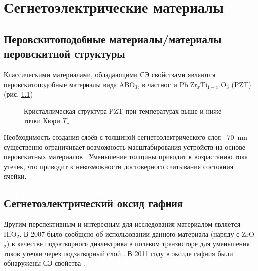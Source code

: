 \chapter{Сегнетоэлектрические материалы}\label{ch:ch1}
\section{Перовскитоподобные материалы/материалы перовскитной структуры}
Классическими материалами, обладающими СЭ свойствами являются перовскитоподобные материалы вида ABO\(_3\), в частности Pb[Zr\(_x\)Ti\(_{1-x}\)]O\(_3\) (PZT) (рис. \cref{fig:pzt})

\begin{figure}[ht]
    \caption{Кристаллическая структура PZT при температурах выше и ниже точки Кюри \(T_c\)}\label{fig:pzt}
\end{figure}

Необходимость создания слоёв с толщиной сегнетоэлектрического слоя \(~\) \SI{70}{\nano\meter} существенно ограничивает возможность масштабирования устройств на основе перовскитных материалов \cite{parkReviewPerspectiveFerroelectric2018}. Уменьшение толщины приводит к возрастанию тока утечек, что приводит к невозможности достоверного считывания состояния ячейки.
\section{Сегнетоэлектрический оксид гафния}\label{sec:ch1/sec1}
Другим перспективным и интересным для исследования материалом является HfO\(_2\). В 2007 было сообщено об использовании данного материала (наряду с ZrO\(_2\)) в качестве подзатворного диэлектрика в полевом транзисторе для уменьшения токов утечки через подзатворный слой \cite{bohrHighkSolution2007}. В 2011 году в оксиде гафния были обнаружены СЭ свойства \cite{bosckeFerroelectricityHafniumOxide2011}.

